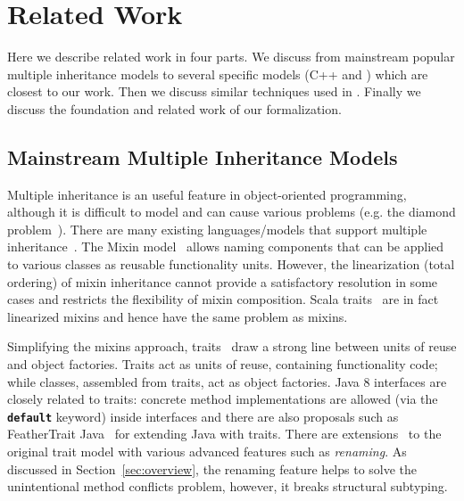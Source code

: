 \section{Related Work}
Here we describe related work in four parts. We discuss from mainstream popular multiple 
inheritance models to several specific models (C++ and \csharp) which are closest to our work. Then we 
discuss similar techniques used in \self. Finally we discuss the foundation and related work of our formalization.

\subsection{Mainstream Multiple Inheritance Models}
Multiple inheritance is an useful feature in object-oriented
programming, although it is difficult to model and can 
cause various problems (e.g. the diamond problem~\cite{Sak89dis,Singh1995}).  
There are many existing languages/models that support multiple 
inheritance~\cite{ellis1990annotated,scala-overview,bracha90mixin,scharli03traits,malayeri2009cz,csharpdoc,Moon1986,Flatt1998,Ancona2003}. 
The Mixin model~\cite{bracha90mixin} allows naming components 
that can be applied to various classes as reusable functionality units. However, the linearization (total ordering) of mixin 
inheritance cannot provide a satisfactory resolution in some cases and restricts the flexibility of mixin composition. 
Scala traits~\cite{scala-overview} are in fact linearized mixins and hence have the same problem as mixins.

Simplifying the mixins approach, traits~\cite{scharli03traits,Ducasse:2006:TMF:1119479.1119483} draw a
strong line between units of reuse and object factories. Traits act
as units of reuse, containing functionality code; while classes,
assembled from traits, act as object factories. Java 8
interfaces are closely related to traits: concrete method
implementations are allowed (via the \textbf{\texttt{default}}
keyword) inside interfaces and there are also proposals such as FeatherTrait Java~\cite{Liquori08ftj} 
for extending Java with traits. There are extensions~\cite{reppy2006foundation,Reppy:2007:MT:2394758.2394784} to 
the original trait model with various advanced features such as \emph{renaming}. As discussed in Section~\ref{sec:overview},
the renaming feature helps to solve the unintentional method conflicts problem, however, it breaks structural subtyping.

